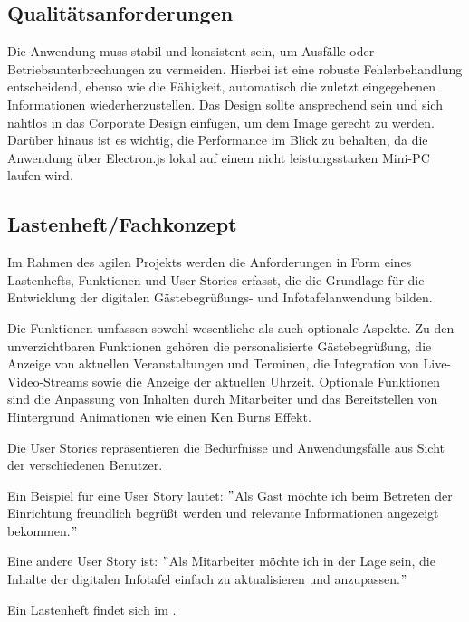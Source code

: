 \subsection{Qualitätsanforderungen}
\label{sec:Qualitaetsanforderungen}
Die Anwendung muss stabil und konsistent sein, um Ausfälle oder Betriebsunterbrechungen zu vermeiden.
Hierbei ist eine robuste Fehlerbehandlung entscheidend, ebenso wie die Fähigkeit, automatisch die zuletzt eingegebenen Informationen wiederherzustellen.
Das Design sollte ansprechend sein und sich nahtlos in das Corporate Design einfügen, um dem Image gerecht zu werden.
Darüber hinaus ist es wichtig, die Performance im Blick zu behalten, da die Anwendung über Electron.js lokal auf einem nicht leistungsstarken Mini-PC laufen wird.


\subsection{Lastenheft/Fachkonzept}
\label{sec:Lastenheft}
Im Rahmen des agilen Projekts werden die Anforderungen in Form eines Lastenhefts, Funktionen und User Stories erfasst, die die Grundlage für die Entwicklung der digitalen Gästebegrüßungs- und Infotafelanwendung bilden.


Die Funktionen umfassen sowohl wesentliche als auch optionale Aspekte.
Zu den unverzichtbaren Funktionen gehören die personalisierte Gästebegrüßung, die Anzeige von aktuellen Veranstaltungen und Terminen, die Integration von Live-Video-Streams sowie die Anzeige der aktuellen Uhrzeit.
Optionale Funktionen sind die Anpassung von Inhalten durch Mitarbeiter und das Bereitstellen von Hintergrund Animationen wie \zB einen Ken Burns Effekt.


Die User Stories repräsentieren die Bedürfnisse und Anwendungsfälle aus Sicht der verschiedenen Benutzer.

Ein Beispiel für eine User Story lautet: \("\)Als Gast möchte ich beim Betreten der Einrichtung freundlich begrüßt werden und relevante Informationen angezeigt bekommen.\("\)

Eine andere User Story ist: \("\)Als Mitarbeiter möchte ich in der Lage sein, die Inhalte der digitalen Infotafel einfach zu aktualisieren und anzupassen.\("\)


Ein Lastenheft findet sich im .
